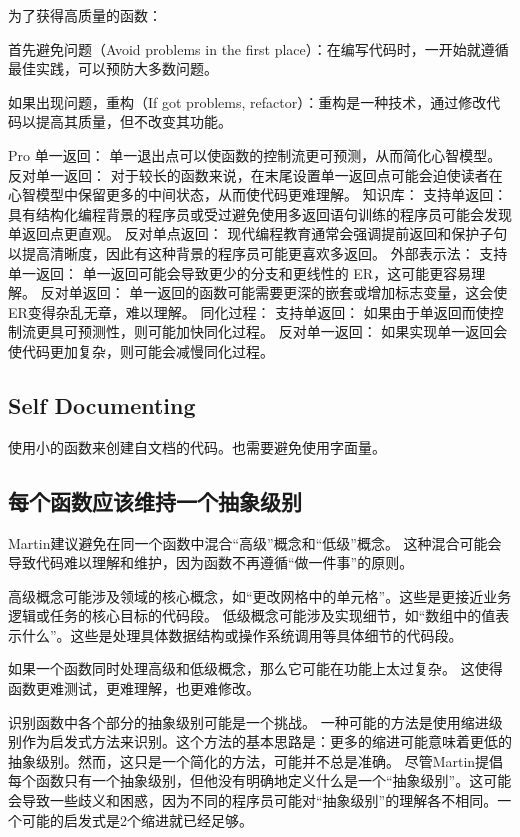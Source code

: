 \documentclass[]{ctexbook}
\begin{document}
为了获得高质量的函数：

首先避免问题（Avoid problems in the first place）：在编写代码时，一开始就遵循最佳实践，可以预防大多数问题。

如果出现问题，重构（If got problems, refactor）：重构是一种技术，通过修改代码以提高其质量，但不改变其功能。

Pro 单一返回： 单一退出点可以使函数的控制流更可预测，从而简化心智模型。
反对单一返回： 对于较长的函数来说，在末尾设置单一返回点可能会迫使读者在心智模型中保留更多的中间状态，从而使代码更难理解。
知识库：
支持单返回： 具有结构化编程背景的程序员或受过避免使用多返回语句训练的程序员可能会发现单返回点更直观。
反对单点返回： 现代编程教育通常会强调提前返回和保护子句以提高清晰度，因此有这种背景的程序员可能更喜欢多返回。
外部表示法：
支持单一返回： 单一返回可能会导致更少的分支和更线性的 ER，这可能更容易理解。
反对单返回： 单一返回的函数可能需要更深的嵌套或增加标志变量，这会使ER变得杂乱无章，难以理解。
同化过程：
支持单返回： 如果由于单返回而使控制流更具可预测性，则可能加快同化过程。
反对单一返回： 如果实现单一返回会使代码更加复杂，则可能会减慢同化过程。

\subsection{Self Documenting}
使用小的函数来创建自文档的代码。也需要避免使用字面量。

\subsection{每个函数应该维持一个抽象级别}
Martin建议避免在同一个函数中混合“高级”概念和“低级”概念。
这种混合可能会导致代码难以理解和维护，因为函数不再遵循“做一件事”的原则。

高级概念可能涉及领域的核心概念，如“更改网格中的单元格”。这些是更接近业务逻辑或任务的核心目标的代码段。
低级概念可能涉及实现细节，如“数组中的值表示什么”。这些是处理具体数据结构或操作系统调用等具体细节的代码段。

如果一个函数同时处理高级和低级概念，那么它可能在功能上太过复杂。
这使得函数更难测试，更难理解，也更难修改。

识别函数中各个部分的抽象级别可能是一个挑战。
一种可能的方法是使用缩进级别作为启发式方法来识别。这个方法的基本思路是：更多的缩进可能意味着更低的抽象级别。然而，这只是一个简化的方法，可能并不总是准确。
尽管Martin提倡每个函数只有一个抽象级别，但他没有明确地定义什么是一个“抽象级别”。这可能会导致一些歧义和困惑，因为不同的程序员可能对“抽象级别”的理解各不相同。一个可能的启发式是2个缩进就已经足够。
\end{document}
